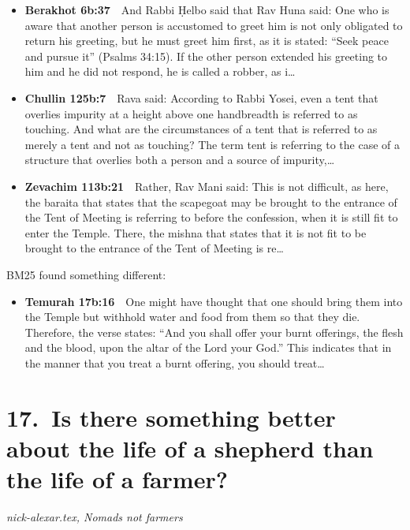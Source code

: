 \documentclass[11pt,a4paper]{article}
\begin{document}
\begin{itemize}[leftmargin=1.2em,itemsep=3pt]
\item {\color{ref}\textbf{Berakhot 6b:37}}\ \ And Rabbi Ḥelbo said that Rav Huna said: One who is aware that another person is accustomed to greet him is not only obligated to return his greeting, but he must greet him first, as it is stated: “Seek peace and pursue it” (Psalms 34:15). If the other person extended his greeting to him and he did not respond, he is called a robber, as i\ldots
\item {\color{ref}\textbf{Chullin 125b:7}}\ \ Rava said: According to Rabbi Yosei, even a tent that overlies impurity at a height above one handbreadth is referred to as touching. And what are the circumstances of a tent that is referred to as merely a tent and not as touching? The term tent is referring to the case of a structure that overlies both a person and a source of impurity,\ldots
\item {\color{ref}\textbf{Zevachim 113b:21}}\ \ Rather, Rav Mani said: This is not difficult, as here, the baraita that states that the scapegoat may be brought to the entrance of the Tent of Meeting is referring to before the confession, when it is still fit to enter the Temple. There, the mishna that states that it is not fit to be brought to the entrance of the Tent of Meeting is re\ldots
\end{itemize}
{\color{quiet}\small BM25 found something different:}
\begin{itemize}[leftmargin=1.2em]
\item {\color{ref}\textbf{Temurah 17b:16}}\ \ One might have thought that one should bring them into the Temple but withhold water and food from them so that they die. Therefore, the verse states: “And you shall offer your burnt offerings, the flesh and the blood, upon the altar of the Lord your God.” This indicates that in the manner that you treat a burnt offering, you should treat\ldots
\end{itemize}

\section*{17.\ Is there something better about the life of a shepherd than the life of a farmer?}
{\color{quiet}\small\textit{nick-alexar.tex, Nomads not farmers}}
\end{document}
